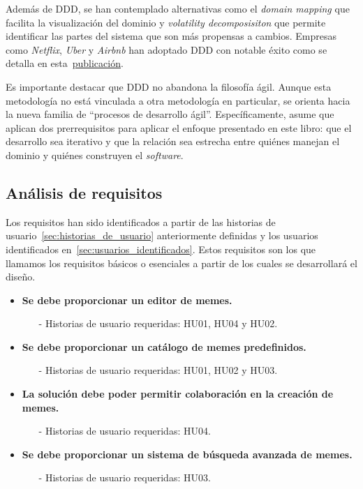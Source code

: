 Además de DDD, se han contemplado alternativas como el \textit{domain mapping} que facilita la visualización del dominio y \textit{volatility decomposisiton} que permite identificar las partes del sistema que son más propensas a cambios. Empresas como \textit{Netflix}, \textit{Uber} y \textit{Airbnb} han adoptado DDD con notable éxito como se detalla en esta~\href{https://blog.bitsrc.io demystifying-domain-driven-design-ddd-in-modern-software-architecture-b57e27c210f7}{publicación}.

Es importante destacar que DDD no abandona la filosofía ágil. Aunque esta metodología no está vinculada a otra metodología en particular, se orienta hacia la nueva familia de ``procesos de desarrollo ágil''. Específicamente, asume que aplican dos prerrequisitos para aplicar el enfoque presentado en este libro: que el desarrollo sea iterativo y que la relación sea estrecha entre quiénes manejan el dominio y quiénes construyen el \textit{software}.

\subsection{Análisis de requisitos}

Los requisitos han sido identificados a partir de las historias de usuario~\ref{sec:historias_de_usuario} anteriormente definidas y los usuarios identificados en~\ref{sec:usuarios_identificados}. Estos requisitos son los que llamamos los requisitos básicos o esenciales a partir de los cuales se desarrollará el diseño.

\begin{itemize}
    \item \textbf{Se debe proporcionar un editor de memes.}
    \begin{itemize}
        \item[-] Historias de usuario requeridas: HU01, HU04 y HU02.
    \end{itemize}
    \item \textbf{Se debe proporcionar un catálogo de memes predefinidos.}
    \begin{itemize}
        \item[-] Historias de usuario requeridas: HU01, HU02 y HU03.
    \end{itemize}
    \item \textbf{La solución debe poder permitir colaboración en la creación de memes.}
    \begin{itemize}
        \item[-] Historias de usuario requeridas: HU04.
    \end{itemize}
    \item \textbf{Se debe proporcionar un sistema de búsqueda avanzada de memes.}
    \begin{itemize}
        \item[-] Historias de usuario requeridas: HU03.
    \end{itemize} 
\end{itemize}

